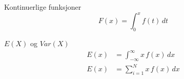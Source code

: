 \documentclass[final,hyperref={pdfpagelabels=false}]{beamer}
\begin{document}
  \begin{frame}{} 
    \begin{columns}[t]
      \begin{column}{.25\linewidth}
		\begin{block}{\normalsize Kontinuerlige funksjoner}
			{\footnotesize
				\[ F(x)=\int_0^xf(t)\,dt \]
			}
        \end{block}
		\begin{block}{\normalsize $E(X)$ og $Var(X)$}
			{\footnotesize
				\begin{equation*}
					\begin{aligned}
						E(x)&=\int_{-\infty}^\infty x\,f(x) \,dx \\
						E(x)&=\sum_{i=1}^N x\,f(x) \,dx \\

\end{aligned}
\end{equation*}}
\end{block}
\end{column}
\end{columns}
\end{frame}
\end{document}
